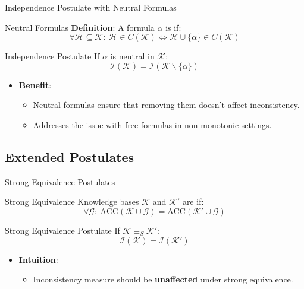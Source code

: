 \begin{frame}{Independence Postulate with Neutral Formulas}
    \begin{block}{Neutral Formulas}
        \textbf{Definition}: A formula \( \alpha \) is  if:
        \[
            \forall \mathcal{H} \subseteq \mathcal{K}:\ \mathcal{H} \in C(\mathcal{K}) \Leftrightarrow \mathcal{H} \cup \{\alpha\} \in C(\mathcal{K})
        \]
    \end{block}
    \begin{block}{Independence Postulate}
        If \( \alpha \) is neutral in \( \mathcal{K} \):
        \[
            \mathcal{I}(\mathcal{K}) = \mathcal{I}(\mathcal{K} \backslash \{\alpha\})
        \]
    \end{block}
    \begin{itemize}
        \item \textbf{Benefit}:
              \begin{itemize}
                  \item Neutral formulas ensure that removing them doesn't affect inconsistency.
                  \item Addresses the issue with free formulas in non-monotonic settings.
              \end{itemize}
    \end{itemize}
\end{frame}

\subsection{Extended Postulates}

\begin{frame}{Strong Equivalence Postulates}
    \begin{block}{Strong Equivalence}
        Knowledge bases \( \mathcal{K} \) and \( \mathcal{K}' \) are  if:
        \[
            \forall \mathcal{G}:\ \text{ACC}(\mathcal{K} \cup \mathcal{G}) = \text{ACC}(\mathcal{K}' \cup \mathcal{G})
        \]
    \end{block}
    \begin{block}{Strong Equivalence Postulate}
        If \( \mathcal{K} \equiv_S \mathcal{K}' \):
        \[
            \mathcal{I}(\mathcal{K}) = \mathcal{I}(\mathcal{K}')
        \]
    \end{block}
    \begin{itemize}
        \item \textbf{Intuition}:
              \begin{itemize}
                  \item Inconsistency measure should be \textbf{unaffected} under strong equivalence.
              \end{itemize}
    \end{itemize}
\end{frame}

